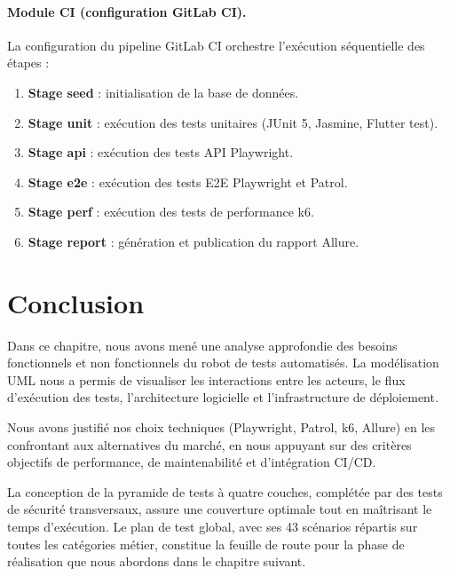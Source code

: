 \paragraph{Module CI (configuration GitLab CI).}
La configuration du pipeline GitLab CI orchestre l'exécution séquentielle des étapes :
\begin{enumerate}[nosep]
    \item \textbf{Stage seed} : initialisation de la base de données.
    \item \textbf{Stage unit} : exécution des tests unitaires (JUnit 5, Jasmine, Flutter test).
    \item \textbf{Stage api} : exécution des tests API Playwright.
    \item \textbf{Stage e2e} : exécution des tests E2E Playwright et Patrol.
    \item \textbf{Stage perf} : exécution des tests de performance k6.
    \item \textbf{Stage report} : génération et publication du rapport Allure.
\end{enumerate}

\section*{Conclusion}

Dans ce chapitre, nous avons mené une analyse approfondie des besoins fonctionnels et non fonctionnels du robot de tests automatisés. La modélisation UML nous a permis de visualiser les interactions entre les acteurs, le flux d'exécution des tests, l'architecture logicielle et l'infrastructure de déploiement.

Nous avons justifié nos choix techniques (Playwright, Patrol, k6, Allure) en les confrontant aux alternatives du marché, en nous appuyant sur des critères objectifs de performance, de maintenabilité et d'intégration CI/CD.

La conception de la pyramide de tests à quatre couches, complétée par des tests de sécurité transversaux, assure une couverture optimale tout en maîtrisant le temps d'exécution. Le plan de test global, avec ses 43 scénarios répartis sur toutes les catégories métier, constitue la feuille de route pour la phase de réalisation que nous abordons dans le chapitre suivant.
